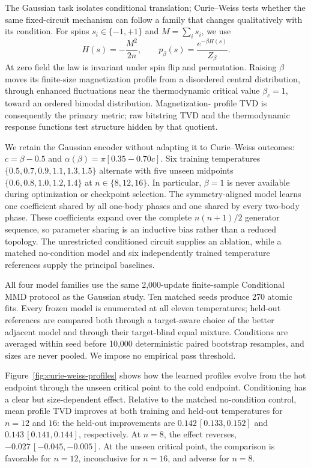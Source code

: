 \documentclass[a4paper,twocolumn,11pt,unpublished]{quantumarticle}
\newif\ifcurieweissresults
\begin{document}
The Gaussian task isolates conditional translation; Curie--Weiss tests
whether the same fixed-circuit mechanism can follow a family that changes
qualitatively with its condition.  For spins $s_i\in\{-1,+1\}$ and
$M=\sum_i s_i$, we use
\begin{equation}
 H(s)=-\frac{M^2}{2n},\qquad p_\beta(s)=\frac{e^{-\beta H(s)}}{Z_\beta}.
\end{equation}
At zero field the law is invariant under spin flip and permutation.  Raising
$\beta$ moves its finite-size magnetization profile from a disordered central
distribution, through enhanced fluctuations near the thermodynamic critical
value $\beta_c=1$, toward an ordered bimodal distribution.  Magnetization-
profile TVD is consequently the primary metric; raw bitstring TVD and the
thermodynamic response functions test structure hidden by that quotient.

We retain the Gaussian encoder without adapting it to Curie--Weiss outcomes:
$c=\beta-0.5$ and $\alpha(\beta)=\pi[0.35-0.70c]$.  Six training temperatures
$\{0.5,0.7,0.9,1.1,1.3,1.5\}$ alternate with five unseen midpoints
$\{0.6,0.8,1.0,1.2,1.4\}$ at $n\in\{8,12,16\}$.  In particular,
$\beta=1$ is never available during optimization or checkpoint selection.
The symmetry-aligned model learns one coefficient shared by all one-body
phases and one shared by every two-body phase.  These coefficients expand over
the complete $n(n+1)/2$ generator sequence, so parameter sharing is an
inductive bias rather than a reduced topology.  The unrestricted conditioned
circuit supplies an ablation, while a matched no-condition model and six
independently trained temperature references supply the principal baselines.

All four model families use the same 2,000-update finite-sample Conditional
MMD protocol as the Gaussian study.  Ten matched seeds produce 270 atomic
fits.  Every frozen model is enumerated at all eleven temperatures; held-out
references are compared both through a target-aware choice of the better
adjacent model and through their target-blind equal mixture.  Conditions are
averaged within seed before 10,000 deterministic paired bootstrap resamples,
and sizes are never pooled.  We impose no empirical pass threshold.

\ifcurieweissresults
Figure~\ref{fig:curie-weiss-profiles} shows how the learned profiles evolve
from the hot endpoint through the unseen critical point to the cold endpoint.
Conditioning has a clear but size-dependent effect.  Relative to the matched
no-condition control, mean profile TVD improves at both training and held-out
temperatures for $n=12$ and $16$: the held-out improvements are
$0.142\,[0.133,0.152]$ and $0.143\,[0.141,0.144]$, respectively.  At $n=8$,
the effect reverses, $-0.027\,[-0.045,-0.005]$.  At the unseen critical point,
the comparison is favorable for $n=12$, inconclusive for $n=16$, and adverse
for $n=8$.
\end{document}
